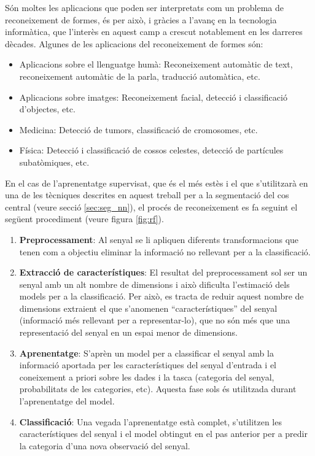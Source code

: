 Són moltes les aplicacions que poden ser interpretats com un problema de reconeixement de formes, és per això, i gràcies a l'avanç en la tecnologia informàtica, que l'interès en aquest camp a crescut notablement en les darreres dècades. Algunes de les aplicacions del reconeixement de formes són:
\begin{itemize}
\item Aplicacions sobre el llenguatge humà: Reconeixement automàtic de text, reconeixement automàtic de la parla, traducció automàtica, etc.
\item Aplicacions sobre imatges: Reconeixement facial, detecció i classificació d'objectes, etc.
\item Medicina: Detecció de tumors, classificació de cromosomes, etc.
\item Física: Detecció i classificació de cossos celestes, detecció de partícules subatòmiques, etc.
\end{itemize}

En el cas de l'aprenentatge supervisat, que és el més estès i el que s'utilitzarà en una de les tècniques descrites en aquest treball per a la segmentació del cos central (veure secció \ref{sec:seg_nn}), el procés de reconeixement es fa seguint el següent procediment (veure figura \ref{fig:rf}).

\begin{enumerate}
\item \textbf{Preprocessament}: Al senyal se li apliquen diferents transformacions que tenen com a objectiu eliminar la informació no rellevant per a la classificació.
\item \textbf{Extracció de característiques}: El resultat del preprocessament sol ser un senyal amb un alt nombre de dimensions i això dificulta l'estimació dels models per a la classificació. Per això, es tracta de reduir aquest nombre de dimensions extraient el que s'anomenen ``característiques'' del senyal (informació més rellevant per a representar-lo), que no són més que una representació del senyal en un espai menor de dimensions.
\item \textbf{Aprenentatge}: S'aprèn un model per a classificar el senyal amb la informació aportada per les característiques del senyal d'entrada i el coneixement a priori sobre les dades i la tasca (categoria del senyal, probabilitats de les categories, etc). Aquesta fase sols és utilitzada durant l'aprenentatge del model.
\item \textbf{Classificació}: Una vegada l'aprenentatge està complet, s'utilitzen les característiques del senyal i el model obtingut en el pas anterior per a predir la categoria d'una nova observació del senyal.
\end{enumerate}

